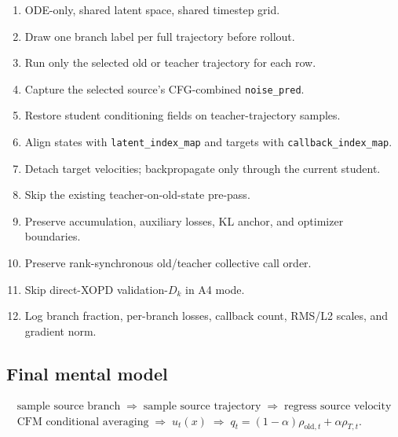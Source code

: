 \documentclass[11pt,a4paper]{article}
\theoremstyle{plain}
\theoremstyle{definition}
\begin{document}
\begin{tcolorbox}[colback=green!5,colframe=green!50!black,title=Minimum correct same-VAE A4]
\begin{enumerate}[leftmargin=1.5em]
\item[$\checkmark$] ODE-only, shared latent space, shared timestep grid.
\item[$\checkmark$] Draw one branch label per full trajectory before rollout.
\item[$\checkmark$] Run only the selected old or teacher trajectory for each row.
\item[$\checkmark$] Capture the selected source's CFG-combined \texttt{noise\_pred}.
\item[$\checkmark$] Restore student conditioning fields on teacher-trajectory samples.
\item[$\checkmark$] Align states with \texttt{latent\_index\_map} and targets with
      \texttt{callback\_index\_map}.
\item[$\checkmark$] Detach target velocities; backpropagate only through the current student.
\item[$\checkmark$] Skip the existing teacher-on-old-state pre-pass.
\item[$\checkmark$] Preserve accumulation, auxiliary losses, KL anchor, and optimizer boundaries.
\item[$\checkmark$] Preserve rank-synchronous old/teacher collective call order.
\item[$\checkmark$] Skip direct-XOPD validation-$D_k$ in A4 mode.
\item[$\checkmark$] Log branch fraction, per-branch losses, callback count, RMS/L2 scales, and
      gradient norm.
\end{enumerate}
\end{tcolorbox}

\subsection{Final mental model}

\begin{equation}
\boxed{
\begin{gathered}
\text{sample source branch}
\;\Longrightarrow\;
\text{sample source trajectory}
\;\Longrightarrow\;
\text{regress source velocity}\\[0.3em]
\text{CFM conditional averaging}
\;\Longrightarrow\;
u_t(x)
\;\Longrightarrow\;
q_t=(1-\alpha)\rho_{\mathrm{old},t}+\alpha\rho_{T,t}.
\end{gathered}
}
\label{eq:mental-model}
\end{equation}
\end{document}
